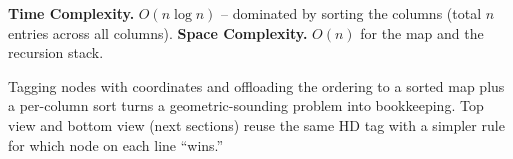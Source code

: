 \begin{complexitybox}
\textbf{Time Complexity.} $O(n\log n)$ -- dominated by sorting the columns
(total $n$ entries across all columns). \textbf{Space Complexity.} $O(n)$
for the map and the recursion stack.
\end{complexitybox}

\begin{takeawaybox}
Tagging nodes with coordinates and offloading the ordering to a sorted map
plus a per-column sort turns a geometric-sounding problem into
bookkeeping. Top view and bottom view (next sections) reuse the same HD
tag with a simpler rule for which node on each line ``wins.''
\end{takeawaybox}
